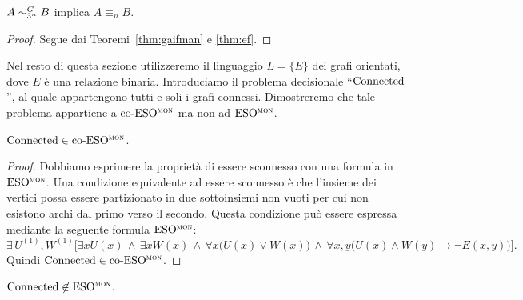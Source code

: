 \begin{corollario}
  $A \sim^{G}_{3^n} B$ implica $A \equiv_n B$.
  \label{cor:gaifman-formule}
\end{corollario}

\begin{proof}
  Segue dai Teoremi~\ref{thm:gaifman} e \ref{thm:ef}.
\end{proof}


Nel resto di questa sezione utilizzeremo il linguaggio $L=\{E\}$ dei grafi orientati, dove $E$ è una relazione binaria.
Introduciamo il problema decisionale ``$\operatorname{Connected}$'', al quale appartengono tutti e soli i grafi connessi.
Dimostreremo che tale problema appartiene a $\operatorname{co-ESO^{\normalfont\textsc{mon}}}$ ma non ad $\operatorname{ESO^{\normalfont\textsc{mon}}}$.

\begin{lemma}
  $\operatorname{Connected} \in \operatorname{co-ESO^{\normalfont\textsc{mon}}}$.
  \label{lemma:connected-coESOmon}
\end{lemma}

\begin{proof}
  Dobbiamo esprimere la proprietà di essere sconnesso con una formula in $\operatorname{ESO^{\normalfont\textsc{mon}}}$.
  Una condizione equivalente ad essere sconnesso è che l'insieme dei vertici possa essere partizionato in due sottoinsiemi non vuoti per cui non esistono archi dal primo verso il secondo. Questa condizione può essere espressa mediante la seguente formula $\operatorname{ESO^{\normalfont\textsc{mon}}}$:
  \[ \exists \, U^{(1)}, W^{(1)} \Big[ \exists x U(x) \,\wedge\, \exists x W(x) \,\wedge\, \forall x \big( U(x) \dot\lor W(x) \big) \,\wedge\, \forall x,y \big( U(x)\wedge W(y) \rightarrow \lnot E(x,y)\big) \Big]. \]
  Quindi $\operatorname{Connected} \in \operatorname{co-ESO^{\normalfont\textsc{mon}}}$.
\end{proof}


\begin{lemma}
  $\operatorname{Connected} \not\in \operatorname{ESO^{\normalfont\textsc{mon}}}$.
  \label{lemma:connected-not-ESOmon}
\end{lemma}

